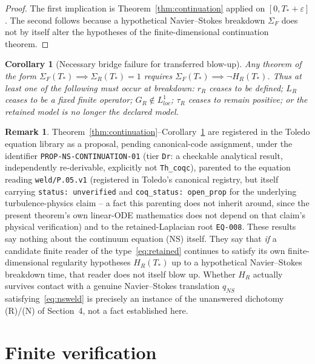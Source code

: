 \documentclass[11pt]{article}
\theoremstyle{plain}
\newtheorem{corollary}[theorem]{Corollary}
\theoremstyle{definition}
\newtheorem{remark}[theorem]{Remark}
\begin{document}
\begin{proof}
The first implication is Theorem~\ref{thm:continuation} applied on $[0,T_*+\varepsilon]$. The
second follows because a hypothetical Navier--Stokes breakdown $\Sigma_F$ does not by itself alter
the hypotheses of the finite-dimensional continuation theorem.
\end{proof}

\begin{corollary}[Necessary bridge failure for transferred blow-up]\label{cor:bridge}
Any theorem of the form $\Sigma_F(T_*) \implies \Sigma_R(T_*)=1$ requires
$\Sigma_F(T_*) \implies \lnot H_R(T_*)$. Thus at least one of the following must occur at
breakdown: $r_R$ ceases to be defined; $L_R$ ceases to be a fixed finite operator;
$G_R \notin L^1_{loc}$; $\tau_R$ ceases to remain positive; or the retained model is no longer the
declared model.
\end{corollary}

\begin{remark}
Theorem~\ref{thm:continuation}--Corollary~\ref{cor:bridge} are registered in the Toledo equation
library as a proposal, pending canonical-code assignment, under the identifier
\texttt{PROP-NS-CONTINUATION-01} (tier \texttt{Dr}: a checkable analytical result,
independently re-derivable, explicitly not \texttt{Th\_coqc}), parented to the equation reading
\texttt{weld/P.05.v1} (registered in Toledo's canonical registry, but itself carrying
\texttt{status: unverified} and \texttt{coq\_status: open\_prop} for the underlying
turbulence-physics claim -- a fact this parenting does not inherit around, since the present
theorem's own linear-ODE mathematics does not depend on that claim's physical verification) and to
the retained-Laplacian root \texttt{EQ-008}. These
results say nothing about the continuum equation (NS) itself. They say that \emph{if} a candidate
finite reader of the type~\eqref{eq:retained} continues to satisfy its own finite-dimensional
regularity hypotheses $H_R(T_*)$ up to a hypothetical Navier--Stokes breakdown time, that reader
does not itself blow up. Whether $H_R$ actually survives contact with a genuine Navier--Stokes
translation $q_{NS}$ satisfying~\eqref{eq:nsweld} is precisely an instance of the unanswered
dichotomy (R)/(N) of Section~4, not a fact established here.
\end{remark}

\section{Finite verification}
\end{document}
